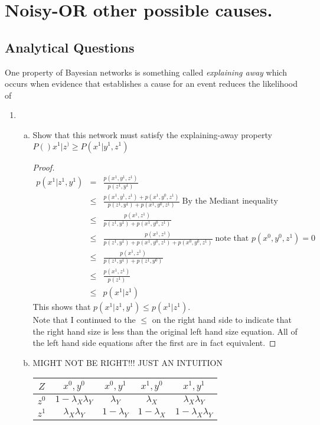 \documentclass[12pt]{article}
\begin{document}
\section{Noisy-OR  other possible causes.}
	\subsection{Analytical Questions}
	One property of Bayesian networks is something called \textit{explaining away }which occurs when
evidence that establishes a cause for an event reduces the likelihood of
		\begin{enumerate}
			\item	
				\begin{enumerate}[(a)]
					\item Show that this network must satisfy the explaining-away property $P()x^1|z^) \geq P(x^1|y^1,z^1)$
					\begin{proof}
					\begin{eqnarray*}
						p(x^1|z^1,y^1) &=& \frac{p(x^1,y^1,z^1)}{p(z^1,y^1)} \\
												&\leq & \frac{p(x^1,y^1,z^1) + p(x^1,y^0,z^1)}{p(z^1,y^1) + p(x^1,y^0,z^1)}\; \text{By the Mediant inequality} \\
												&\leq & \frac{p(x^1,z^1)}{p(z^1,y^1) + p(x^1,y^0,z^1)} \\
												&\leq & \frac{p(x^1,z^1)}{p(z^1,y^1) + p(x^1,y^0,z^1) + p(x^0,y^0,z^1)}\; \text{note that } p(x^0,y^0,z^1) = 0 \\
												&\leq & \frac{p(x^1,z^1)}{p(z^1,y^1) + p(z^1,y^0)} \\
												&\leq & \frac{p(x^1,z^1)}{p(z^1)} \\
												&\leq & p(x^1|z^1)
					\end{eqnarray*}
					This shows that $p(x^1|z^1,y^1) \leq p(x^1|z^1)$. \\
					Note that I continued to the $\leq$ on the right hand side to indicate that the right hand size is less than the original left hand size equation. All of the left hand side equations after the first are in fact equivalent. 
					\end{proof}
						\item 
						MIGHT NOT BE RIGHT!!! JUST AN INTUITION \\
							\begin{tabular}{c||c c c c}
								$Z$ & $x^0,y^0$ & $x^0,y^1$ & $x^1,y^0$ & $x^1,y^1$  \\ \hline
								$z^0$ & $1 - \lambda_X\lambda_Y$ & $\lambda_Y$ & $\lambda_X$ & $\lambda_X\lambda_Y$ \\
								$z^1$ & $\lambda_X\lambda_Y$ & $1 - \lambda_Y$ & $1- \lambda_X$ & $1- \lambda_X\lambda_Y$
							

\end{tabular}
\end{enumerate}
\end{enumerate}
\end{document}
